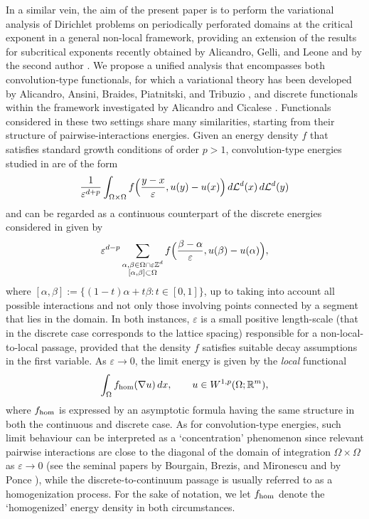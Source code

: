 \documentclass{article}
\theoremstyle{plain}
\theoremstyle{definition}
\def\e{\varepsilon}
\def\rr{{\mathbb R}}
\def\ZZ{{\mathbb Z}}
\numberwithin{equation}{section}
\begin{document}
In a similar vein, the aim of the present paper is to perform the variational analysis of Dirichlet problems on periodically perforated domains at the critical exponent in a general non-local framework, providing an extension of the results for subcritical exponents recently obtained by Alicandro, Gelli, and Leone \cite{AGL} and by the second author \cite{Fus}. We propose a unified analysis that encompasses both convolution-type functionals, for which a variational theory has been developed by Alicandro, Ansini, Braides, Piatnitski, and Tribuzio \cite{AABPT}, and discrete functionals within the framework investigated by Alicandro and Cicalese \cite{AliCic}. Functionals considered in these two settings share many similarities, starting from their structure of pairwise-interactions energies. Given an energy density $f$ that satisfies standard growth conditions of order $p>1$, convolution-type energies studied in \cite{AABPT} are of the form 
\begin{equation*}
    \frac{1}{\e^{d+p}}\int_{\Omega\times\Omega}f\Bigl(\frac{y-x}{\e}, u(y)-u(x)\Bigr)\, d\mathcal{L}^d(x)\, d\mathcal{L}^d(y)
\end{equation*}
and can be regarded as a continuous counterpart of the discrete energies considered in \cite{AliCic} given by
\begin{equation*}
\e^{d-p}\sum_{{\substack{\alpha,\beta\in \Omega\cap\e\ZZ^d \\ [\alpha,\beta]\subset \Omega}}}f\Bigl(\frac{\beta-\alpha}{\e}, u(\beta)-u(\alpha)\Bigr),
\end{equation*}
where $[\alpha,\beta]:=\{(1-t)\alpha+t\beta: t\in[0,1]\}$, up to taking into account all possible interactions and not only those involving points connected by a segment that lies in the domain. In both instances, $\e$ is a small positive length-scale (that in the discrete case corresponds to the lattice spacing) responsible for a non-local-to-local passage, provided that the density $f$ satisfies suitable decay assumptions in the first variable. As $\e\to0$, the limit energy is given by the \textit{local} functional
\begin{equation*}
    \int_\Omega f_{\rm hom}(\nabla u)\, dx, \qquad u \in W^{1,p}(\Omega; \rr^m),
\end{equation*}
where $f_{\rm hom}$ is expressed by an asymptotic formula having the same structure in both the continuous and discrete case. As for convolution-type energies, such limit behaviour can be interpreted as a `concentration' phenomenon since relevant pairwise interactions are close to the diagonal of the domain of integration $\Omega\times \Omega$ as $\e\to0$ (see the seminal papers by Bourgain, Brezis, and Mironescu \cite{BBM} and by Ponce \cite{P2, P1}), while the discrete-to-continuum passage is usually referred to as a homogenization process. For the sake of notation, we let $f_{\rm hom}$ denote the `homogenized' energy density in both circumstances. 
\end{document}
